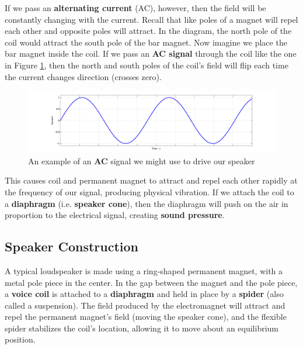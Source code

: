 \documentclass[11pt]{article}
\begin{document}
If we pass an {\bf alternating current} (AC), however, then the field will be constantly changing with the current. Recall that like poles of a magnet will repel each other and opposite poles will attract. In the diagram, the north pole of the coil would attract the south pole of the bar magnet. Now imagine we place the bar magnet inside the coil. If we pass an {\bf AC signal} through the coil like the one in Figure \ref{fig:sine}, then the north and south poles of the coil's field will flip each time the current changes direction (crosses zero).

\begin{figure}[htb]\center
\includegraphics[width=\textwidth]{images/sine.pdf}
\caption{An example of an {\bf AC} signal we might use to drive our speaker}
\label{fig:sine}
\end{figure}

 This causes coil and permanent magnet to attract and repel each other rapidly at the frequency of our signal, producing physical vibration. If we attach the coil to a {\bf diaphragm} (i.e. {\bf speaker cone}), then the diaphragm will push on the air in proportion to the electrical signal, creating {\bf sound pressure}.

\subsection*{Speaker Construction}

A typical loudspeaker is made using a ring-shaped permanent magnet, with a metal pole piece in the center. In the gap between the magnet and the pole piece, a {\bf voice coil} is attached to a {\bf diaphragm} and held in place by a {\bf spider} (also called a suspension). The field produced by the electromagnet will attract and repel the permanent magnet's field (moving the speaker cone), and the flexible spider stabilizes the coil's location, allowing it to move about an equilibrium position.
\end{document}
